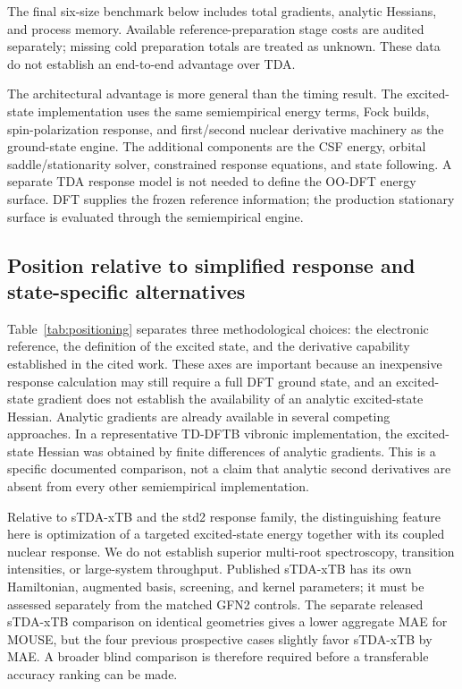 \documentclass[11pt,a4paper]{article}
\begin{document}
The final six-size benchmark below includes total gradients, analytic Hessians, and process memory. Available reference-preparation stage costs are audited separately; missing cold preparation totals are treated as unknown. These data do not establish an end-to-end advantage over TDA.

The architectural advantage is more general than the timing result. The excited-state implementation uses the same semiempirical energy terms, Fock builds, spin-polarization response, and first/second nuclear derivative machinery as the ground-state engine. The additional components are the CSF energy, orbital saddle/stationarity solver, constrained response equations, and state following. A separate TDA response model is not needed to define the OO-DFT energy surface. DFT supplies the frozen reference information; the production stationary surface is evaluated through the semiempirical engine.

\subsection{Position relative to simplified response and state-specific alternatives}

Table~\ref{tab:positioning} separates three methodological choices: the electronic reference, the definition of the excited state, and the derivative capability established in the cited work. These axes are important because an inexpensive response calculation may still require a full DFT ground state, and an excited-state gradient does not establish the availability of an analytic excited-state Hessian. Analytic gradients are already available in several competing approaches. In a representative TD-DFTB vibronic implementation, the excited-state Hessian was obtained by finite differences of analytic gradients.\cite{tddftbvib2016} This is a specific documented comparison, not a claim that analytic second derivatives are absent from every other semiempirical implementation.

Relative to sTDA-xTB and the std2 response family, the distinguishing feature here is optimization of a targeted excited-state energy together with its coupled nuclear response. We do not establish superior multi-root spectroscopy, transition intensities, or large-system throughput. Published sTDA-xTB has its own Hamiltonian, augmented basis, screening, and kernel parameters; it must be assessed separately from the matched GFN2 controls. The separate released sTDA-xTB comparison on identical geometries gives a lower aggregate MAE for MOUSE, but the four previous prospective cases slightly favor sTDA-xTB by MAE. A broader blind comparison is therefore required before a transferable accuracy ranking can be made.
\end{document}
